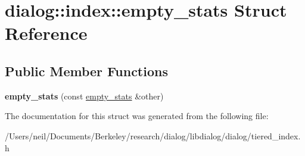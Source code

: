 \hypertarget{structdialog_1_1index_1_1empty__stats}{}\section{dialog\+:\+:index\+:\+:empty\+\_\+stats Struct Reference}
\label{structdialog_1_1index_1_1empty__stats}
\subsection*{Public Member Functions}
\begin{DoxyCompactItemize}
\item 
\mbox{\label{structdialog_1_1index_1_1empty__stats_a7c00752571aa457e561a9e97202a4b32}} 
{\bfseries empty\+\_\+stats} (const \hyperlink{structdialog_1_1index_1_1empty__stats}{empty\+\_\+stats} \&other)
\end{DoxyCompactItemize}


The documentation for this struct was generated from the following file\+:\begin{DoxyCompactItemize}
\item 
/\+Users/neil/\+Documents/\+Berkeley/research/dialog/libdialog/dialog/tiered\+\_\+index.\+h\end{DoxyCompactItemize}
